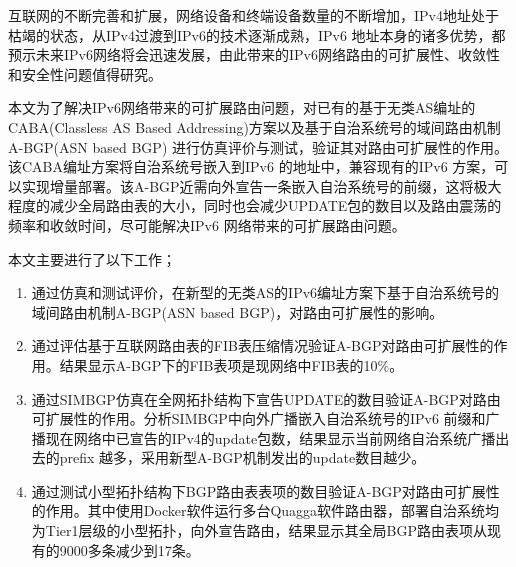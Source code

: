 \begin{cabstract}
  互联网的不断完善和扩展，网络设备和终端设备数量的不断增加，IPv4地址处于枯竭的状态，从IPv4过渡到IPv6的技术逐渐成熟，IPv6 地址本身的诸多优势，都预示未来IPv6网络将会迅速发展，由此带来的IPv6网络路由的可扩展性、收敛性和安全性问题值得研究。

  本文为了解决IPv6网络带来的可扩展路由问题，对已有的基于无类AS编址的CABA(Classless AS Based Addressing)方案以及基于自治系统号的域间路由机制A-BGP(ASN based BGP) 进行仿真评价与测试，验证其对路由可扩展性的作用。该CABA编址方案将自治系统号嵌入到IPv6 的地址中，兼容现有的IPv6 方案，可以实现增量部署。该A-BGP近需向外宣告一条嵌入自治系统号的前缀，这将极大程度的减少全局路由表的大小，同时也会减少UPDATE包的数目以及路由震荡的频率和收敛时间，尽可能解决IPv6 网络带来的可扩展路由问题。

  本文主要进行了以下工作；

  \begin{enumerate}
  \item 通过仿真和测试评价，在新型的无类AS的IPv6编址方案下基于自治系统号的域间路由机制A-BGP(ASN based BGP)，对路由可扩展性的影响。
  \item 通过评估基于互联网路由表的FIB表压缩情况验证A-BGP对路由可扩展性的作用。结果显示A-BGP下的FIB表项是现网络中FIB表的10\%。
  \item 通过SIMBGP仿真在全网拓扑结构下宣告UPDATE的数目验证A-BGP对路由可扩展性的作用。分析SIMBGP中向外广播嵌入自治系统号的IPv6 前缀和广播现在网络中已宣告的IPv4的update包数，结果显示当前网络自治系统广播出去的prefix 越多，采用新型A-BGP机制发出的update数目越少。
  \item 通过测试小型拓扑结构下BGP路由表表项的数目验证A-BGP对路由可扩展性的作用。其中使用Docker软件运行多台Quagga软件路由器，部署自治系统均为Tier1层级的小型拓扑，向外宣告路由，结果显示其全局BGP路由表项从现有的9000多条减少到17条。
  \end{enumerate}
\end{cabstract}


